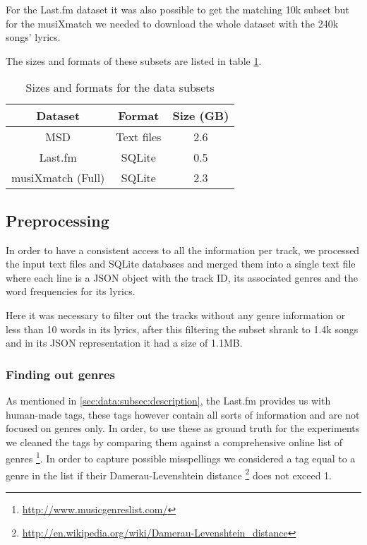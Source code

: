 \documentclass[11pt,a4paper,twoside]{scrartcl}
\begin{document}
    For the Last.fm dataset it was also possible to get the matching 10k
    subset but for the musiXmatch we needed to download the whole dataset
    with the 240k songs' lyrics.
    
    The sizes and formats of these subsets are listed in table
    \ref{tab:size_subset}.

    \begin{table}
      \center
      \caption{Sizes and formats for the data subsets}
      \begin{tabular}{|c|c|c|}
      \hline
      Dataset & Format & Size (GB) \\
      \hline
      MSD & Text files & 2.6 \\
      Last.fm & SQLite & 0.5 \\
      musiXmatch (Full) & SQLite & 2.3 \\
      \hline
      \end{tabular}
      \label{tab:size_subset}
    \end{table}

    \subsection{Preprocessing}
      In order to have a consistent access to all the information per track,
      we processed the input text files and SQLite databases and merged them
      into a single text file where each line is a JSON object with the
      track ID, its associated genres and the word frequencies for its
      lyrics.
      
      Here it was necessary to filter out the tracks without any genre information
      or less than 10 words in its lyrics, after this filtering the subset
      shrank to 1.4k songs and in its JSON representation it had a size of 1.1MB.
      
      \subsubsection{Finding out genres}    
        As mentioned in \ref{sec:data:subsec:description}, the Last.fm provides us
        with human-made tags, these tags however contain all sorts of information
        and are not focused on genres only. In order, to use these
        as ground truth for the experiments we cleaned the tags by comparing
        them against a comprehensive online list of genres
        \footnote{\url{http://www.musicgenreslist.com/}}.
        In order to capture possible misspellings we considered a tag equal to
        a genre in the list if their Damerau-Levenshtein distance
        \footnote{\url{http://en.wikipedia.org/wiki/Damerau-Levenshtein_distance}}
        does not exceed 1.
      
\end{document}
